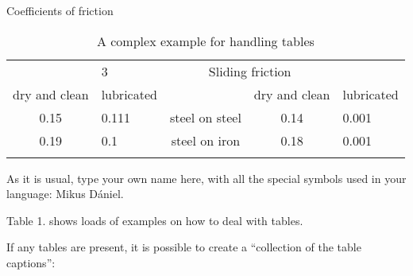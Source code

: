 \documentclass{article}
\begin{document}
\begin{table}[]
    \caption{A complex example for handling tables}
    \centering
    \renewcommand{\caption}[1]{#1}
   \caption{Coefficients of friction} \\
    \begin{tabular}{||c|l|c|c|l||}
     \hhline{|t:=====:t|}
        \multicolumn{2}{||c|}{Static friction} & 3 & \multicolumn{2}{|c||}{Sliding friction} \\
        \hhline{|#--#-#--#|}
        dry and clean  & lubricated &  & dry and clean & lubricated  \\
        \hhline{|:=====:|}
        0.15 & 0.111 & steel on steel & 0.14 & 0.001  \\
        \hhline{||}
        0.19  & 0.1 & steel on iron & 0.18 & 0.001 \\
        \hhline{|b:=====:b|}
    \end{tabular}
    \label{tab:my_label}
\end{table}
\par
As it is usual, type your own name here, with all the special symbols used in your language: Mikus Dániel. \par
Table 1. shows loads of examples on how to deal with tables. \par
If any tables are present, it is possible to create a “collection of the table captions”:
\listoftables
\end{document}
